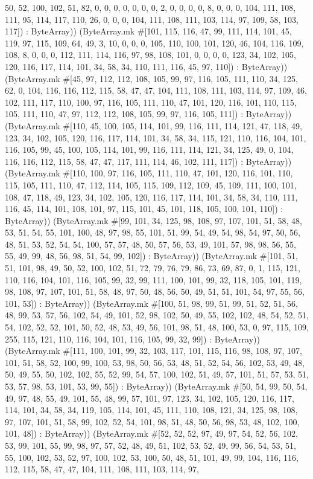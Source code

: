 \documentclass[11pt]{article}
\begin{document}
50, 52, 100, 102, 51, 82, 0, 0, 0, 0, 0, 0, 0, 2, 0, 0, 0, 0, 8, 0, 0, 0, 104, 111, 108, 111, 95, 114, 117, 110, 26, 0, 0, 0, 104, 111, 108, 111, 103, 114, 97, 109, 58, 103, 117]) : ByteArray)) (ByteArray.mk \#[101, 115, 116, 47, 99, 111, 114, 101, 45, 119, 97, 115, 109, 64, 49, 3, 10, 0, 0, 0, 105, 110, 100, 101, 120, 46, 104, 116, 109, 108, 8, 0, 0, 0, 112, 111, 114, 116, 97, 98, 108, 101, 0, 0, 0, 0, 123, 34, 102, 105, 120, 116, 117, 114, 101, 34, 58, 34, 110, 111, 116, 45, 97, 110]) : ByteArray)) (ByteArray.mk \#[45, 97, 112, 112, 108, 105, 99, 97, 116, 105, 111, 110, 34, 125, 62, 0, 104, 116, 116, 112, 115, 58, 47, 47, 104, 111, 108, 111, 103, 114, 97, 109, 46, 102, 111, 117, 110, 100, 97, 116, 105, 111, 110, 47, 101, 120, 116, 101, 110, 115, 105, 111, 110, 47, 97, 112, 112, 108, 105, 99, 97, 116, 105, 111]) : ByteArray)) (ByteArray.mk \#[110, 45, 100, 105, 114, 101, 99, 116, 111, 114, 121, 47, 118, 49, 123, 34, 102, 105, 120, 116, 117, 114, 101, 34, 58, 34, 115, 121, 110, 116, 104, 101, 116, 105, 99, 45, 100, 105, 114, 101, 99, 116, 111, 114, 121, 34, 125, 49, 0, 104, 116, 116, 112, 115, 58, 47, 47, 117, 111, 114, 46, 102, 111, 117]) : ByteArray)) (ByteArray.mk \#[110, 100, 97, 116, 105, 111, 110, 47, 101, 120, 116, 101, 110, 115, 105, 111, 110, 47, 112, 114, 105, 115, 109, 112, 109, 45, 109, 111, 100, 101, 108, 47, 118, 49, 123, 34, 102, 105, 120, 116, 117, 114, 101, 34, 58, 34, 110, 111, 116, 45, 114, 101, 108, 101, 97, 115, 101, 45, 101, 118, 105, 100, 101, 110]) : ByteArray)) (ByteArray.mk \#[99, 101, 34, 125, 98, 108, 97, 107, 101, 51, 58, 48, 53, 51, 54, 55, 101, 100, 48, 97, 98, 55, 101, 51, 99, 54, 49, 54, 98, 54, 97, 50, 56, 48, 51, 53, 52, 54, 54, 100, 57, 57, 48, 50, 57, 56, 53, 49, 101, 57, 98, 98, 56, 55, 55, 49, 99, 48, 56, 98, 51, 54, 99, 102]) : ByteArray)) (ByteArray.mk \#[101, 51, 51, 101, 98, 49, 50, 52, 100, 102, 51, 72, 79, 76, 79, 86, 73, 69, 87, 0, 1, 115, 121, 110, 116, 104, 101, 116, 105, 99, 32, 99, 111, 100, 101, 99, 32, 118, 105, 101, 119, 98, 108, 97, 107, 101, 51, 58, 48, 97, 50, 48, 56, 50, 49, 51, 51, 101, 54, 97, 55, 56, 101, 53]) : ByteArray)) (ByteArray.mk \#[100, 51, 98, 99, 51, 99, 51, 52, 51, 56, 48, 99, 53, 57, 56, 102, 54, 49, 101, 52, 98, 102, 50, 49, 55, 102, 102, 48, 54, 52, 51, 54, 102, 52, 52, 101, 50, 52, 48, 53, 49, 56, 101, 98, 51, 48, 100, 53, 0, 97, 115, 109, 255, 115, 121, 110, 116, 104, 101, 116, 105, 99, 32, 99]) : ByteArray)) (ByteArray.mk \#[111, 100, 101, 99, 32, 103, 117, 101, 115, 116, 98, 108, 97, 107, 101, 51, 58, 52, 100, 99, 100, 53, 98, 50, 56, 53, 48, 51, 52, 54, 56, 102, 53, 49, 48, 50, 49, 55, 50, 102, 102, 55, 52, 99, 54, 57, 100, 102, 51, 49, 57, 101, 51, 57, 53, 51, 53, 57, 98, 53, 101, 53, 99, 55]) : ByteArray)) (ByteArray.mk \#[50, 54, 99, 50, 54, 49, 97, 48, 55, 49, 101, 55, 48, 99, 57, 101, 97, 123, 34, 102, 105, 120, 116, 117, 114, 101, 34, 58, 34, 119, 105, 114, 101, 45, 111, 110, 108, 121, 34, 125, 98, 108, 97, 107, 101, 51, 58, 99, 102, 52, 54, 101, 98, 51, 48, 50, 56, 98, 53, 48, 102, 100, 101, 48]) : ByteArray)) (ByteArray.mk \#[52, 52, 52, 97, 49, 97, 54, 52, 56, 102, 53, 99, 101, 55, 99, 98, 97, 57, 52, 48, 49, 51, 102, 53, 52, 49, 99, 56, 54, 53, 51, 55, 100, 102, 53, 52, 97, 100, 102, 53, 100, 50, 48, 51, 101, 49, 99, 104, 116, 116, 112, 115, 58, 47, 47, 104, 111, 108, 111, 103, 114, 97, 
\end{document}
